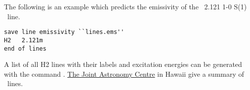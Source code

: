The following is an example which predicts the emissivity of the \htwo\ 2.121 1-0 S(1) \micron\ line.
\begin{verbatim}
save line emissivity ``lines.ems''
H2   2.121m
end of lines
\end{verbatim}

A list of all H2 lines with their labels and excitation energies can
be generated with the command .
\href{http://jach.hawaii.edu/UKIRT/astronomy/calib/spec\_cal/h2\_s.html}{The Joint Astronomy Centre} in Hawaii give a
summary of \htwo\ lines.

